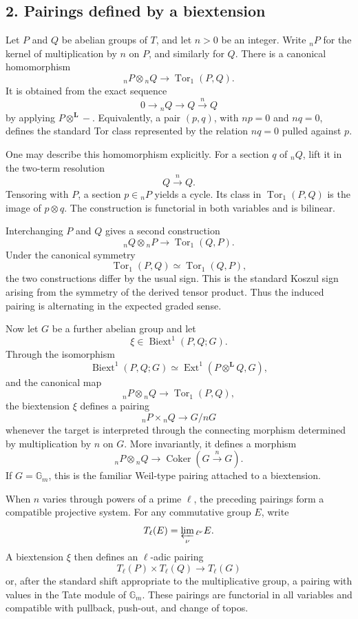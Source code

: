 \documentclass[11pt]{article}
\newcommand{\bL}{\mathbf L}
\newcommand{\Gm}{\mathbb G_m}
\newcommand{\Ext}{\operatorname{Ext}}
\newcommand{\Tor}{\operatorname{Tor}}
\newcommand{\Biext}{\operatorname{Biext}}
\begin{document}
\subsection*{2. Pairings defined by a biextension}

Let \(P\) and \(Q\) be abelian groups of \(T\), and let \(n>0\) be an integer.
Write \({}_nP\) for the kernel of multiplication by \(n\) on \(P\), and similarly
for \(Q\). There is a canonical homomorphism
\[
{}_nP\otimes {}_nQ\longrightarrow \Tor_1(P,Q).
\]
It is obtained from the exact sequence
\[
0\to {}_nQ\to Q\xrightarrow{n}Q
\]
by applying \(P\otimes^{\bL}-\). Equivalently, a pair
\((p,q)\), with \(np=0\) and \(nq=0\), defines the standard Tor class represented
by the relation \(nq=0\) pulled against \(p\).

One may describe this homomorphism explicitly. For a section \(q\) of
\({}_nQ\), lift it in the two-term resolution
\[
Q\xrightarrow{n}Q.
\]
Tensoring with \(P\), a section \(p\in {}_nP\) yields a cycle. Its class in
\(\Tor_1(P,Q)\) is the image of \(p\otimes q\). The construction is functorial
in both variables and is bilinear.

Interchanging \(P\) and \(Q\) gives a second construction
\[
{}_nQ\otimes {}_nP\longrightarrow \Tor_1(Q,P).
\]
Under the canonical symmetry
\[
\Tor_1(P,Q)\simeq \Tor_1(Q,P),
\]
the two constructions differ by the usual sign. This is the standard Koszul sign
arising from the symmetry of the derived tensor product. Thus the induced pairing
is alternating in the expected graded sense.

Now let \(G\) be a further abelian group and let
\[
\xi\in \Biext^1(P,Q;G).
\]
Through the isomorphism
\[
\Biext^1(P,Q;G)\simeq \Ext^1(P\otimes^{\bL}Q,G),
\]
and the canonical map
\[
{}_nP\otimes {}_nQ\to \Tor_1(P,Q),
\]
the biextension \(\xi\) defines a pairing
\[
{}_nP\times {}_nQ\longrightarrow G/nG
\]
whenever the target is interpreted through the connecting morphism determined by
multiplication by \(n\) on \(G\). More invariantly, it defines a morphism
\[
{}_nP\otimes {}_nQ\longrightarrow
\operatorname{Coker}(G\xrightarrow{n}G).
\]
If \(G=\Gm\), this is the familiar Weil-type pairing attached to a biextension.

When \(n\) varies through powers of a prime \(\ell\), the preceding pairings form
a compatible projective system. For any commutative group \(E\), write
\[
T_\ell(E)=\varprojlim_\nu {}_{\ell^\nu}E.
\]
A biextension \(\xi\) then defines an \(\ell\)-adic pairing
\[
T_\ell(P)\times T_\ell(Q)\longrightarrow T_\ell(G)
\]
or, after the standard shift appropriate to the multiplicative group, a pairing
with values in the Tate module of \(\Gm\). These pairings are functorial in all
variables and compatible with pullback, push-out, and change of topos.
\end{document}
